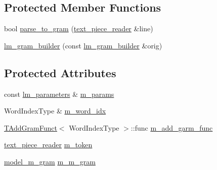 \subsection*{Protected Member Functions}
\begin{DoxyCompactItemize}
\item 
bool \hyperlink{classuva_1_1smt_1_1bpbd_1_1server_1_1lm_1_1arpa_1_1lm__gram__builder_a26f00c78cee0ee27e578206551a6303b}{parse\+\_\+to\+\_\+gram} (\hyperlink{classuva_1_1utils_1_1file_1_1text__piece__reader}{text\+\_\+piece\+\_\+reader} \&line)
\item 
\hyperlink{classuva_1_1smt_1_1bpbd_1_1server_1_1lm_1_1arpa_1_1lm__gram__builder_a94dd63c1c1737c5bb40b2277c72270bc}{lm\+\_\+gram\+\_\+builder} (const \hyperlink{classuva_1_1smt_1_1bpbd_1_1server_1_1lm_1_1arpa_1_1lm__gram__builder}{lm\+\_\+gram\+\_\+builder} \&orig)
\end{DoxyCompactItemize}
\subsection*{Protected Attributes}
\begin{DoxyCompactItemize}
\item 
const \hyperlink{structuva_1_1smt_1_1bpbd_1_1server_1_1lm_1_1lm__parameters}{lm\+\_\+parameters} \& \hyperlink{classuva_1_1smt_1_1bpbd_1_1server_1_1lm_1_1arpa_1_1lm__gram__builder_ae9e727cf174b8d61d1e9f88ac30a50e5}{m\+\_\+params}
\item 
Word\+Index\+Type \& \hyperlink{classuva_1_1smt_1_1bpbd_1_1server_1_1lm_1_1arpa_1_1lm__gram__builder_af9cf5c614babb6928aaec282d2a8eb94}{m\+\_\+word\+\_\+idx}
\item 
\hyperlink{structuva_1_1smt_1_1bpbd_1_1server_1_1lm_1_1arpa_1_1_t_add_gram_funct}{T\+Add\+Gram\+Funct}$<$ Word\+Index\+Type $>$\+::func \hyperlink{classuva_1_1smt_1_1bpbd_1_1server_1_1lm_1_1arpa_1_1lm__gram__builder_a9773e2b8af83ad5744bc9efbf3726770}{m\+\_\+add\+\_\+garm\+\_\+func}
\item 
\hyperlink{classuva_1_1utils_1_1file_1_1text__piece__reader}{text\+\_\+piece\+\_\+reader} \hyperlink{classuva_1_1smt_1_1bpbd_1_1server_1_1lm_1_1arpa_1_1lm__gram__builder_a4c8cc56d2df6905cf6d24fa3cfe9669a}{m\+\_\+token}
\item 
\hyperlink{classuva_1_1smt_1_1bpbd_1_1server_1_1lm_1_1m__grams_1_1model__m__gram}{model\+\_\+m\+\_\+gram} \hyperlink{classuva_1_1smt_1_1bpbd_1_1server_1_1lm_1_1arpa_1_1lm__gram__builder_a2b1b788450d31a1f2f0a6e89c28c6a1f}{m\+\_\+m\+\_\+gram}
\end{DoxyCompactItemize}
